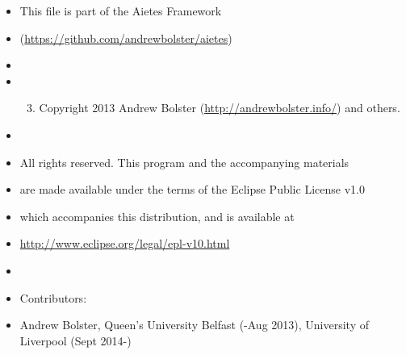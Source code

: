 \documentclass[letterpaper,10pt,english]{sphinxmanual}
\begin{document}
\label{index:module-polybos}\begin{itemize}
\item {} 
This file is part of the Aietes Framework

\item {} 
(\href{https://github.com/andrewbolster/aietes}{https://github.com/andrewbolster/aietes})

\item {} 
\item {} \begin{enumerate}
\setcounter{enumi}{2}
\item {} 
Copyright 2013 Andrew Bolster (\href{http://andrewbolster.info/}{http://andrewbolster.info/}) and others.

\end{enumerate}

\item {} 
\item {} 
All rights reserved. This program and the accompanying materials

\item {} 
are made available under the terms of the Eclipse Public License v1.0

\item {} 
which accompanies this distribution, and is available at

\item {} 
\href{http://www.eclipse.org/legal/epl-v10.html}{http://www.eclipse.org/legal/epl-v10.html}

\item {} 
\item {} 
Contributors:

\item {} 
Andrew Bolster, Queen's University Belfast (-Aug 2013), University of Liverpool (Sept 2014-)

\end{itemize}
\end{document}
